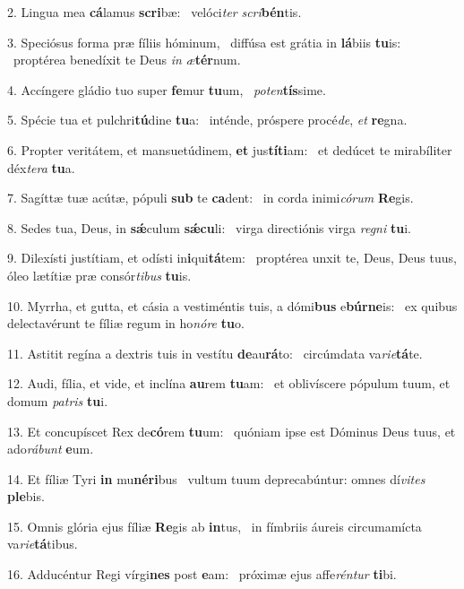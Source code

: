 2. Lingua mea \textbf{cá}lamus \textbf{scri}bæ: \ast\  velóci\textit{ter} \textit{scri}\textbf{bén}tis.\

3. Speciósus forma præ fíliis hóminum, \dag\  diffúsa est grátia in \textbf{lá}biis \textbf{tu}is: \ast\  proptérea benedíxit te Deus \textit{in} \textit{æ}\textbf{tér}num.\

4. Accíngere gládio tuo super \textbf{fe}mur \textbf{tu}um, \ast\  \textit{pot}\textit{en}\textbf{tís}sime.\

5. Spécie tua et pulchri\textbf{tú}dine \textbf{tu}a: \ast\  inténde, próspere procé\textit{de}, \textit{et} \textbf{re}gna.\

6. Propter veritátem, et mansuetúdinem, \textbf{et} jus\textbf{tí}\textbf{ti}am: \ast\  et dedúcet te mirabíliter déx\textit{te}\textit{ra} \textbf{tu}a.\

7. Sagíttæ tuæ acútæ, pópuli \textbf{sub} te \textbf{ca}dent: \ast\  in corda inimi\textit{có}\textit{rum} \textbf{Re}gis.\

8. Sedes tua, Deus, in \textbf{sǽ}culum \textbf{sǽ}\textbf{cu}li: \ast\  virga directiónis virga \textit{re}\textit{gni} \textbf{tu}i.\

9. Dilexísti justítiam, et odísti in\textbf{i}qui\textbf{tá}tem: \ast\  proptérea unxit te, Deus, Deus tuus, óleo lætítiæ præ consór\textit{ti}\textit{bus} \textbf{tu}is.\

10. Myrrha, et gutta, et cásia a vestiméntis tuis, a dómi\textbf{bus} e\textbf{búr}\textbf{ne}is: \ast\  ex quibus delectavérunt te fíliæ regum in ho\textit{nó}\textit{re} \textbf{tu}o.\

11. Astitit regína a dextris tuis in vestítu \textbf{de}au\textbf{rá}to: \ast\  circúmdata va\textit{ri}\textit{e}\textbf{tá}te.\

12. Audi, fília, et vide, et inclína \textbf{au}rem \textbf{tu}am: \ast\  et oblivíscere pópulum tuum, et domum \textit{pa}\textit{tris} \textbf{tu}i.\

13. Et concupíscet Rex de\textbf{có}rem \textbf{tu}um: \ast\  quóniam ipse est Dóminus Deus tuus, et ado\textit{rá}\textit{bunt} \textbf{e}um.\

14. Et fíliæ Tyri \textbf{in} mu\textbf{né}\textbf{ri}bus \ast\  vultum tuum deprecabúntur: omnes dí\textit{vi}\textit{tes} \textbf{ple}bis.\

15. Omnis glória ejus fíliæ \textbf{Re}gis ab \textbf{in}tus, \ast\  in fímbriis áureis circumamícta va\textit{ri}\textit{e}\textbf{tá}tibus.\

16. Adducéntur Regi vírgi\textbf{nes} post \textbf{e}am: \ast\  próximæ ejus affe\textit{rén}\textit{tur} \textbf{ti}bi.\

